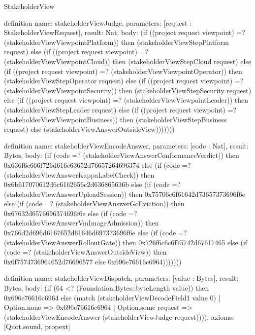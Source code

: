 \begin{lexlean}{StakeholderView}
\begin{semanticmodule}
definition{
  name: stakeholderViewJudge,
  parameters: [request : StakeholderViewRequest],
  result: Nat,
  body: (if ((project request viewpoint) =? (stakeholderViewViewpointPlatform)) then (stakeholderViewStepPlatform request) else (if ((project request viewpoint) =? (stakeholderViewViewpointCloud)) then (stakeholderViewStepCloud request) else (if ((project request viewpoint) =? (stakeholderViewViewpointOperator)) then (stakeholderViewStepOperator request) else (if ((project request viewpoint) =? (stakeholderViewViewpointSecurity)) then (stakeholderViewStepSecurity request) else (if ((project request viewpoint) =? (stakeholderViewViewpointLeader)) then (stakeholderViewStepLeader request) else (if ((project request viewpoint) =? (stakeholderViewViewpointBusiness)) then (stakeholderViewStepBusiness request) else (stakeholderViewAnswerOutsideView)))))))
}

definition{
  name: stakeholderViewEncodeAnswer,
  parameters: [code : Nat],
  result: Bytes,
  body: (if (code =? (stakeholderViewAnswerConformanceVerdict)) then 0x636f6e666f726d616e63652d76657264696374 else (if (code =? (stakeholderViewAnswerKappaLabelCheck)) then 0x6b617070612d6c6162656c2d636865636b else (if (code =? (stakeholderViewAnswerUploadSession)) then 0x75706c6f61642d73657373696f6e else (if (code =? (stakeholderViewAnswerGcEviction)) then 0x67632d6576696374696f6e else (if (code =? (stakeholderViewAnswerVmImageAdmission)) then 0x766d2d696d6167652d61646d697373696f6e else (if (code =? (stakeholderViewAnswerRolloutGate)) then 0x726f6c6c6f75742d67617465 else (if (code =? (stakeholderViewAnswerOutsideView)) then 0x6f7574736964652d76696577 else 0x696e76616c6964)))))))
}

definition{
  name: stakeholderViewDispatch,
  parameters: [value : Bytes],
  result: Bytes,
  body: (if (64 <? (Foundation.Bytes::byteLength value)) then 0x696e76616c6964 else (match (stakeholderViewDecodeField1 value 0)
    | Option.none => 0x696e76616c6964
    | Option.some request => (stakeholderViewEncodeAnswer (stakeholderViewJudge request)))),
  axioms: [Quot.sound, propext]
}
\end{semanticmodule}
\end{lexlean}
